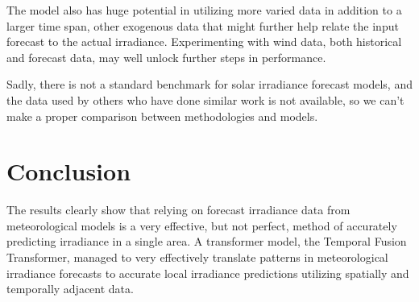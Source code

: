 The model also has huge potential in utilizing more varied data in addition to a larger time span, other exogenous data that might further help relate the input forecast to the actual irradiance. Experimenting with wind data, both historical and forecast data, may well unlock further steps in performance.

Sadly, there is not a standard benchmark for solar irradiance forecast models, and the data used by others who have done similar work is not available, so we can't make a proper comparison between methodologies and models. 

\section{Conclusion\label{sec:conclusions}}
The results clearly show that relying on forecast irradiance data from meteorological models is a very effective, but not perfect, method of accurately predicting irradiance in a single area. A transformer model, the Temporal Fusion Transformer, managed to very effectively translate patterns in meteorological irradiance forecasts to accurate local irradiance predictions utilizing spatially and temporally adjacent data.\\

